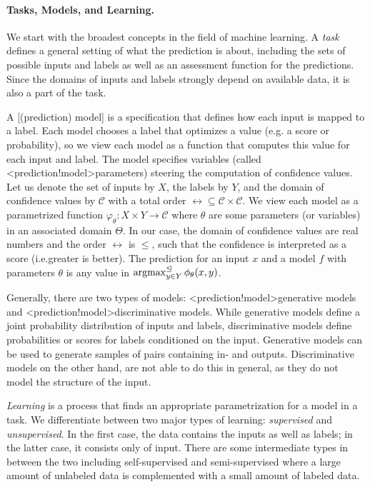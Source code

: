 \documentclass[../document.tex]{subfiles}
\begin{document}
    \paragraph{Tasks, Models, and Learning.}
    We start with the broadest concepts in the field of machine learning.
    A \emph{task} defines a general setting of what the prediction is about, including the sets of possible inputs and labels as well as an assessment function for the predictions.
    Since the domains of inputs and labels strongly depend on available data, it is also a part of the task.

    A [(prediction) model] is a specification that defines how each input is mapped to a label.
    Each model chooses a label that optimizes a  value (e.g. a score or probability), so we view each model as a function that computes this value for each input and label.
    The model specifies variables (called <prediction!model>{parameters}) steering the computation of confidence values.
    Let us denote the set of inputs by \(X\), the labels by \(Y\), and the domain of confidence values by \(\mathcal{C}\) with a total order \(\rel \subseteq \mathcal{C} \times \mathcal{C}\).
    We view each model as a parametrized function \(\varphi_\theta\colon X \times Y \to \mathcal{C}\) where \(\theta\) are some parameters (or variables) in an associated domain \(\Theta\).
    In our case, the domain of confidence values are real numbers and the order \(\rel\) is \(\leq\), such that the confidence is interpreted as a score (i.e.\@ greater is better).
    The prediction for an input \(x\) and a model \(f\) with parameters \(\theta\) is any value in \(\operatorname{arg max}^{\mathrel{\unlhd}}_{y \in Y} \phi_\theta(x, y)\).

    Generally, there are two types of models: <prediction!model>{generative models} and <prediction!model>{discriminative models}.
    While generative models define a joint probability distribution of inputs and labels, discriminative models define probabilities or scores for labels conditioned on the input.
    Generative models can be used to generate samples of pairs containing in- and outputs.
    Discriminative models on the other hand, are not able to do this in general, as they do not model the structure of the input.

    \emph{Learning} is a process that finds an appropriate parametrization for a model in a task.
    We differentiate between two major types of learning: \emph{supervised} and \emph{unsupervised}.
    In the first case, the data contains the inputs as well as labels; in the latter case, it consists only of input.
    There are some intermediate types in between the two including self-supervised and semi-supervised where a large amount of unlabeled data is complemented with a small amount of labeled data.
\end{document}
